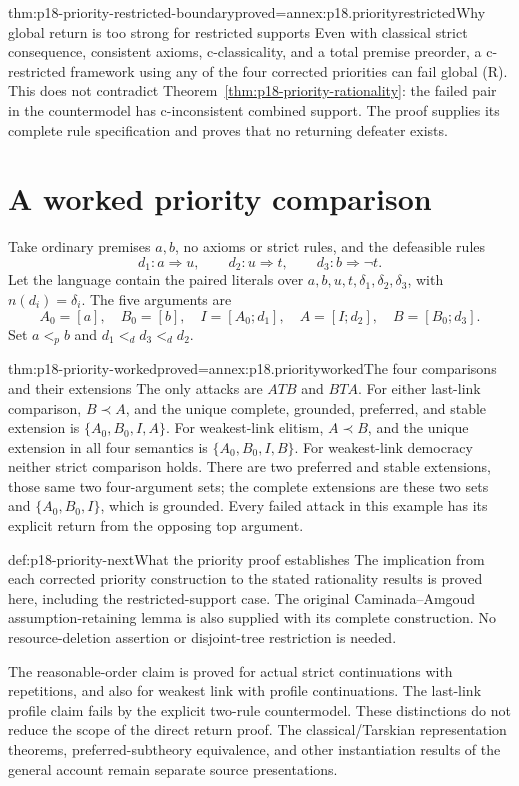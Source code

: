 \begin{hbtheorem}{thm:p18-priority-restricted-boundary}{proved=annex:p18.priorityrestricted}{Why global return is too strong for restricted supports}
Even with classical strict consequence, consistent axioms,
c-classicality, and a total premise preorder, a c-restricted framework
using any of the four corrected priorities can fail global (R).
This does not contradict Theorem~\ref{thm:p18-priority-rationality}:
the failed pair in the countermodel has c-inconsistent combined support.
The proof supplies its complete rule specification and proves that
no returning defeater exists.
\end{hbtheorem}

\section{A worked priority comparison}

Take ordinary premises \(a,b\), no axioms or strict rules, and the
defeasible rules
\[
 d_1:a\Rightarrow u,\qquad
 d_2:u\Rightarrow t,\qquad
 d_3:b\Rightarrow\neg t.
\]
Let the language contain the paired literals over
\(a,b,u,t,\delta_1,\delta_2,\delta_3\), with \(n(d_i)=\delta_i\).
The five arguments are
\[
 A_0=[a],\quad B_0=[b],\quad
 I=[A_0;d_1],\quad A=[I;d_2],\quad B=[B_0;d_3].
\]
Set \(a<_p b\) and \(d_1<_d d_3<_d d_2\).

\begin{hbtheorem}{thm:p18-priority-worked}{proved=annex:p18.priorityworked}{The four comparisons and their extensions}
The only attacks are \(A T B\) and \(B T A\).
For either last-link comparison, \(B\prec A\), and the unique
complete, grounded, preferred, and stable extension is
\(\{A_0,B_0,I,A\}\).
For weakest-link elitism, \(A\prec B\), and the unique extension
in all four semantics is \(\{A_0,B_0,I,B\}\).
For weakest-link democracy neither strict comparison holds.
There are two preferred and stable extensions, those same two
four-argument sets; the complete extensions are these two sets and
\(\{A_0,B_0,I\}\), which is grounded.
Every failed attack in this example has its explicit return from the
opposing top argument.
\end{hbtheorem}

\begin{proofboundary}{def:p18-priority-next}{What the priority proof establishes}
The implication from each corrected priority construction to the
stated rationality results is proved here, including the restricted-support
case. The original Caminada--Amgoud assumption-retaining lemma is also
supplied with its complete construction.
No resource-deletion assertion or disjoint-tree restriction is needed.

The reasonable-order claim is proved for actual strict continuations
with repetitions, and also for weakest link with profile continuations.
The last-link profile claim fails by the explicit two-rule countermodel.
These distinctions do not reduce the scope of the direct return proof.
The classical/Tarskian representation theorems, preferred-subtheory
equivalence, and other
instantiation results of the general account remain separate source
presentations.
\end{proofboundary}
